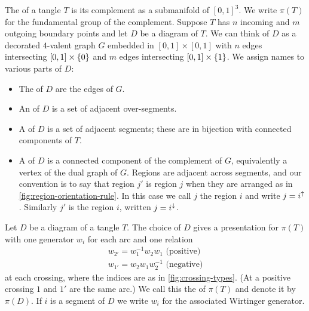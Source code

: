 \documentclass[leqno]{sl2art}
\begin{document}
\begin{definition}
  The  of a tangle \(T\) is its complement as a submanifold of \([0,1]^{3}\).
  We write \(\pi(T)\) for the fundamental group of the complement.
  Suppose \(T\) has \(n\) incoming and \(m\) outgoing boundary points and let \(D\) be a diagram of \(T\).
  We can think of \(D\) as a decorated \(4\)-valent graph \(G\) embedded in \([0,1] \times [0,1]\) with \(n\) edges intersecting \([0,1] \times \set{0}\) and \(m\) edges intersecting \([0,1] \times \set{1}\).
  We assign names to various parts of \(D\):
  \begin{itemize}
    \item
     The  of \(D\) are the edges%
      of \(G\).
    \item
    An  of \(D\) is a set of adjacent over-segments.
    \item
      A  of \(D\) is a set of adjacent segments; these are in bijection with connected components of \(T\).
    \item
    A  of \(D\) is a connected component of the complement of \(G\), equivalently a vertex of the dual graph of \(G\).
    Regions are adjacent across segments, and our convention is to say that region \(j'\) is  region \(j\) when they are arranged as in \cref{fig:region-orientation-rule}.
    In this case we call \(j\) the region  \(i\) and write \(j = \upr i\).
    Similarly \(j'\) is the region  \(i\), written \(j = i^{\downarrow}\).
  \end{itemize}
\end{definition}

\begin{marginfigure}
  
  \caption{
    In this case we say that region \(j'\) is below region \(j\) across segment \(i\).
    We write \(j = \upr i\) and \(j' = \dnr i\) to refer to the regions adjacent to segment \(i\).
  }
  \label{fig:region-orientation-rule}
\end{marginfigure}

\begin{proposition}
  \label{thm:wirtinger}
  Let \(D\) be a diagram of a tangle \(T\).
  The choice of \(D\) gives a presentation for \(\pi(T)\) with one generator \(w_i\) for each arc and one relation
  \begin{gather}
    \label{eq:wirtinger-positive}
    w_{2'} = w_{1}^{-1} w_{2} w_{1} \text{ (positive)}
    \\
    \label{eq:wirtinger-negative}
    w_{1'} = w_{2} w_{1} w_{2}^{-1} \text{ (negative)}
  \end{gather}
  at each crossing, where the indices are as in \cref{fig:crossing-types}.
  (At a positive crossing \(1\) and \(1'\)  are the same arc.)
  We call this the  of \(\pi(T)\) and denote it by \(\pi(D)\).
  If \(i\) is a segment of \(D\) we write \(w_{i}\) for the associated Wirtinger generator.
\end{proposition}
\end{document}
